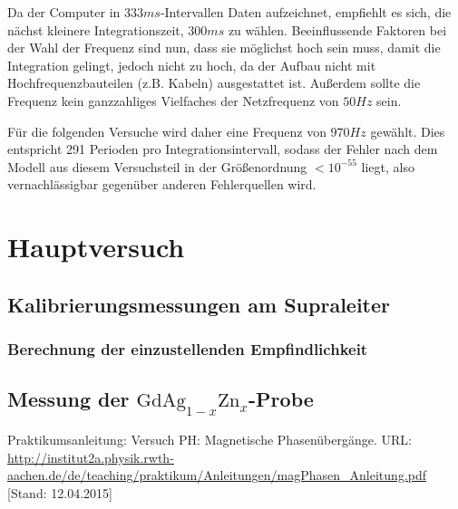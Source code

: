 \documentclass{../Misc/MontavonLaTeX/Montavon}
\newcommand{\gdagzn}{$\textrm{GdAg}_{1-x}\textrm{Zn}_x$}
\begin{document}
Da der Computer in $333 \unit{ms}$-Intervallen Daten aufzeichnet, empfiehlt es sich, die nächst kleinere Integrationszeit, $300 \unit{ms}$ zu wählen.
Beeinflussende Faktoren bei der Wahl der Frequenz sind nun, dass sie möglichst hoch sein muss, damit die Integration gelingt, jedoch nicht zu hoch, da der Aufbau nicht mit Hochfrequenzbauteilen (z.B. Kabeln) ausgestattet ist. Außerdem sollte die Frequenz kein ganzzahliges Vielfaches der Netzfrequenz von $50 \unit{Hz}$ sein.

Für die folgenden Versuche wird daher eine Frequenz von $970 \unit{Hz}$ gewählt. Dies entspricht 291 Perioden pro Integrationsintervall, sodass der Fehler nach dem Modell aus diesem Versuchsteil in der Größenordnung $< 10^{-55}$ liegt, also vernachlässigbar gegenüber anderen Fehlerquellen wird. 


\section{Hauptversuch}
\subsection{Kalibrierungsmessungen am Supraleiter}
\subsubsection{Berechnung der einzustellenden Empfindlichkeit}

\subsection{Messung der \gdagzn-Probe}


\newpage
\begin{thebibliography}{xxxx}
 Praktikumsanleitung: Versuch PH: Magnetische Phasenübergänge. URL: \url{http://institut2a.physik.rwth-aachen.de/de/teaching/praktikum/Anleitungen/magPhasen_Anleitung.pdf} [Stand: 12.04.2015]
\end{thebibliography}
\end{document}

